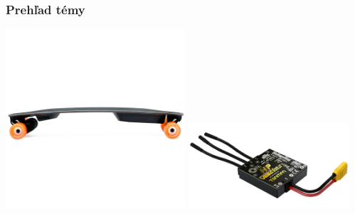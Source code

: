 




\begin{frame}
  \frametitle{Prehľad témy}
  \centering
  \includegraphics[width=0.5\textwidth]{figures/brand-reviews/boosted-longboard.png}
  \includegraphics[width=0.45\textwidth]{figures/vesc.png}
\end{frame}
  
